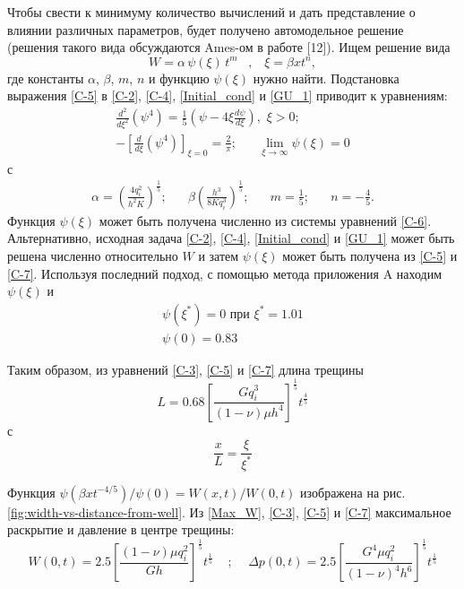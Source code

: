 \documentclass[a4paper, 11pt]{article}
\newcommand{\beq}{\begin{equation}}
\newcommand{\eeq}{\end{equation}}
\begin{document}
Чтобы свести к минимуму количество вычислений и дать представление о влиянии различных параметров, будет получено автомодельное решение (решения такого вида обсуждаются Ames-ом в работе [12]).
Ищем решение вида
\beq\label{C-5}
W=\alpha\,\psi(\xi)\,t^m\,\,\,\,\,,\,\,\,\,\,\xi=\beta xt^n,
\tag{C-5}
\eeq
где константы $\alpha$, $\beta$, $m$, $n$ и функцию $\psi(\xi)$ нужно найти.
Подстановка выражения \eqref{C-5} в \eqref{C-2}, \eqref{C-4}, \eqref{Initial_cond} и \eqref{GU_1} приводит к уравнениям:
\beq\label{C-6}
\begin{split}
\frac{d^2}{d\xi^2}\left(\psi^4\right)=\frac{1}{5}\left(\psi-4\xi\frac{d\psi}{d\xi}\right),\,\,\xi>0;\\[4pt]
-\left[\frac{d}{d\xi}\left(\psi^4\right)\right]_{\xi=0}=\frac{2}{\pi};\,\,\,\,\,\,\,\,\,\,\lim_{\xi\to\infty}{\psi(\xi)}=0
\end{split}
\tag{C-6}
\eeq
с
\beq\label{C-7}
\begin{split}
\alpha=\left(\frac{4q_i^2}{h^2K}\right)^{\!\!\frac{1}{5}};\,\,\,\,\,\,\,\,\,\,\beta\left(\frac{h^3}{8Kq_i^3}\right)^{\!\!\frac{1}{5}};\,\,\,\,\,\,\,\,\,\,m=\frac{1}{5};\,\,\,\,\,\,\,\,\,\,n=-\frac{4}{5}.
\end{split}
\tag{C-7}
\eeq
Функция $\psi(\xi)$ может быть получена численно из системы уравнений \eqref{C-6}.
Альтернативно, исходная задача \eqref{C-2}, \eqref{C-4}, \eqref{Initial_cond} и \eqref{GU_1} может быть решена численно относительно $W$ и затем $\psi(\xi)$ может быть получена из \eqref{C-5} и \eqref{C-7}.
Используя последний подход, с помощью метода приложения A находим $\psi(\xi)$ и
\beq\label{C-8}
\begin{split}
\psi(\xi^*)=0\text{ при }\xi^*=1.01\\
\psi(0)=0.83\,\,\,\,\,\,\,\,\,\,\,\,\,\,\,\,\,\,\,
\end{split}
\tag{C-8}
\eeq

Таким образом, из уравнений \eqref{C-3}, \eqref{C-5} и \eqref{C-7} длина трещины
\beq\label{C-9}
L=0.68\left[\frac{Gq_i^3}{(1-\nu)\mu h^4}\right]^{\frac{1}{5}}t^{\frac{4}{5}}
\tag{C-9}
\eeq
с
$$
\frac{x}{L}=\frac{\xi}{\xi^*}
$$

Функция $\psi(\beta xt^{-4/5})/\psi(0)=W(x,t)/W(0,t)$ изображена на рис. \ref{fig:width-vs-distance-from-well}.
Из \eqref{Max_W}, \eqref{C-3}, \eqref{C-5} и \eqref{C-7} максимальное раскрытие и давление в центре трещины:
\beq\label{C-10}
W(0,t)=2.5\left[\frac{(1-\nu)\mu q_i^2}{Gh}\right]^{\!\frac{1}{5}}t^{\frac{1}{5}}\,\,\,\,\,\,\,;\,\,\,\,\,\,\,\Delta p(0,t)=2.5\left[\frac{G^4\mu q_i^2}{(1-\nu)^4h^6}\right]^{\frac{1}{5}}t^{\frac{1}{5}}
\tag{C-10}
\eeq
\end{document}
